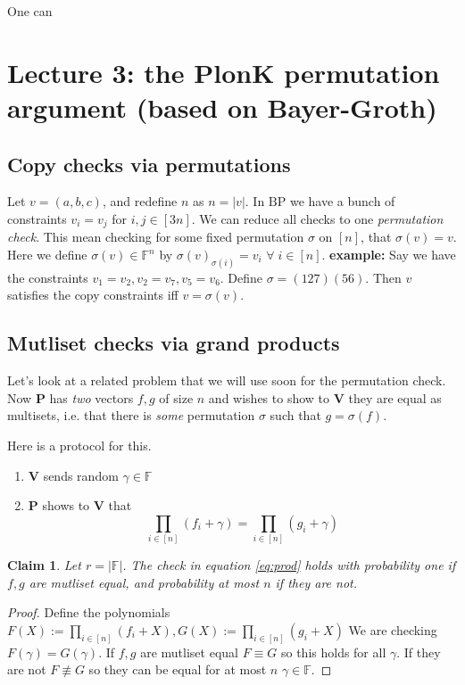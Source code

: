 \documentclass[11pt]{article} %
\newcommand{\F}{\ensuremath{\mathbb F}\xspace}
\newcommand{\defeq}{:=}
\newcommand{\prv}{\ensuremath{\mathsf{\mathbf{P}}}\xspace}
\newcommand{\ver}{\ensuremath{\mathsf{\mathbf{V}}}\xspace}
\newtheorem{claim}[lemma]{Claim}
\newcommand{\prog}{\ensuremath{\mathrm{BP}}\xspace}
\begin{document}
One can 

\section{Lecture 3: the PlonK permutation argument (based on Bayer-Groth)}
\subsection{Copy checks via permutations}
Let $v=(a,b,c)$, and redefine $n$ as $n=|v|$. In \prog we have a bunch of constraints $v_i=v_j$ for $i,j \in [3n]$.
We can reduce all checks to one \emph{permutation check}.
This mean checking for some fixed permutation $\sigma$ on $[n]$, that $\sigma(v)=v$.
Here we define $\sigma(v)\in \F^n$ by $\sigma(v)_{\sigma(i)} =v_i$ $\forall\; i\in [n]$.
\textbf{example:}
Say we have the constraints $v_1=v_2, v_2=v_7, v_5=v_6$.
Define $\sigma= (127)(56)$.
Then $v$ satisfies the copy constraints iff $v=\sigma(v)$.


\subsection{Mutliset checks via grand products}
Let's look at a related problem that we will use soon for the permutation check.
Now \prv has  \emph{two} vectors $f,g$ of size $n$ and wishes to show to \ver they are equal as multisets,
i.e. that there is \emph{some} permutation $\sigma$ such that $g=\sigma(f)$.

Here is a protocol for this.
\begin{enumerate}
 \item \ver sends random $\gamma\in \F$
 \item \prv shows to \ver  that 
 \[\prod_{i\in [n]} (f_i+\gamma) = \prod_{i\in [n]}(g_i+\gamma)\]\label{eq:prod}
\end{enumerate}
\begin{claim}
Let $r=|\F|$.
 The check in equation \ref{eq:prod} holds with probability one if $f,g$ are mutliset equal,
 and probability at most $n$ if they are not.
\end{claim}
\begin{proof}
Define the polynomials 
$F(X)\defeq \prod_{i\in [n]} (f_i+X),G(X)\defeq \prod_{i\in [n]} (g_i+X)$
We are checking $F(\gamma)=G(\gamma)$. If $f,g$ are mutliset equal $F\equiv G$ so this holds for all $\gamma$.
If they are not $F\not\equiv G$ so they can be equal for at most $n$ $\gamma\in \F$.
\end{proof}
\end{document}
